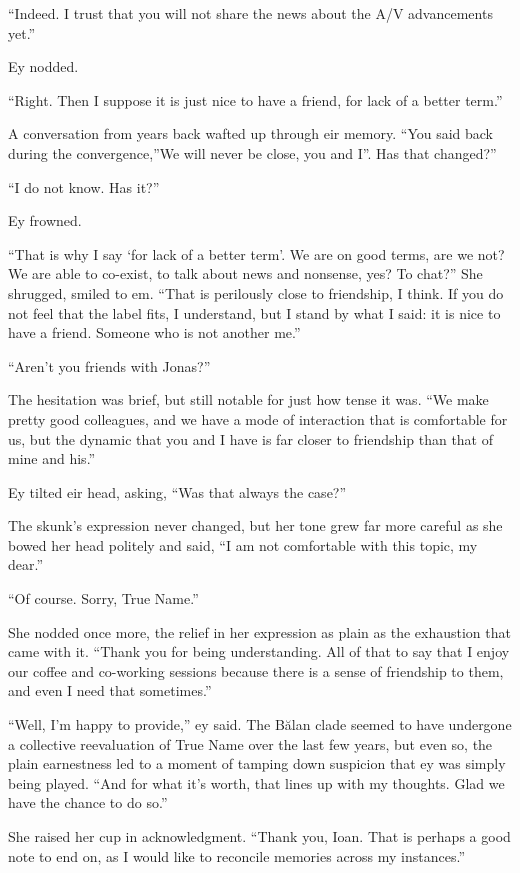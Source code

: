 ``Indeed. I trust that you will not share the news about the A/V advancements yet.''

Ey nodded.

``Right. Then I suppose it is just nice to have a friend, for lack of a better term.''

A conversation from years back wafted up through eir memory. ``You said back during the convergence,''We will never be close, you and I''. Has that changed?''

``I do not know. Has it?''

Ey frowned.

``That is why I say `for lack of a better term'. We are on good terms, are we not? We are able to co-exist, to talk about news and nonsense, yes? To chat?'' She shrugged, smiled to em. ``That is perilously close to friendship, I think. If you do not feel that the label fits, I understand, but I stand by what I said: it is nice to have a friend. Someone who is not another me.''

``Aren't you friends with Jonas?''

The hesitation was brief, but still notable for just how tense it was. ``We make pretty good colleagues, and we have a mode of interaction that is comfortable for us, but the dynamic that you and I have is far closer to friendship than that of mine and his.''

Ey tilted eir head, asking, ``Was that always the case?''

The skunk's expression never changed, but her tone grew far more careful as she bowed her head politely and said, ``I am not comfortable with this topic, my dear.''

``Of course. Sorry, True Name.''

She nodded once more, the relief in her expression as plain as the exhaustion that came with it. ``Thank you for being understanding. All of that to say that I enjoy our coffee and co-working sessions because there is a sense of friendship to them, and even I need that sometimes.''

``Well, I'm happy to provide,'' ey said. The Bălan clade seemed to have undergone a collective reevaluation of True Name over the last few years, but even so, the plain earnestness led to a moment of tamping down suspicion that ey was simply being played. ``And for what it's worth, that lines up with my thoughts. Glad we have the chance to do so.''

She raised her cup in acknowledgment. ``Thank you, Ioan. That is perhaps a good note to end on, as I would like to reconcile memories across my instances.''

